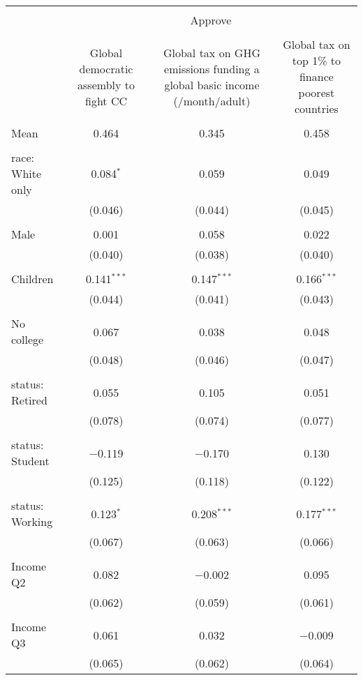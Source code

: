 
\begin{tabular}{@{\extracolsep{5pt}}lccc} 
\\[-1.8ex]\hline 
\hline \\[-1.8ex] 
 & \multicolumn{3}{c}{Approve} \\ 
\cline{2-4} 
\\[-1.8ex] & Global democratic assembly to fight CC & Global tax on GHG emissions funding a global basic income (\textdollar 30/month/adult) & Global tax on top 1\% to finance poorest countries \\ 
\hline \\[-1.8ex] 
 Mean & 0.464 & 0.345 & 0.458  \\ \hline \\[-1.8ex] race: White only & 0.084$^{*}$ & 0.059 & 0.049 \\ 
  & (0.046) & (0.044) & (0.045) \\ 
  & & & \\ 
 Male & 0.001 & 0.058 & 0.022 \\ 
  & (0.040) & (0.038) & (0.040) \\ 
  & & & \\ 
 Children & 0.141$^{***}$ & 0.147$^{***}$ & 0.166$^{***}$ \\ 
  & (0.044) & (0.041) & (0.043) \\ 
  & & & \\ 
 No college & 0.067 & 0.038 & 0.048 \\ 
  & (0.048) & (0.046) & (0.047) \\ 
  & & & \\ 
 status: Retired & 0.055 & 0.105 & 0.051 \\ 
  & (0.078) & (0.074) & (0.077) \\ 
  & & & \\ 
 status: Student & $-$0.119 & $-$0.170 & 0.130 \\ 
  & (0.125) & (0.118) & (0.122) \\ 
  & & & \\ 
 status: Working & 0.123$^{*}$ & 0.208$^{***}$ & 0.177$^{***}$ \\ 
  & (0.067) & (0.063) & (0.066) \\ 
  & & & \\ 
 Income Q2 & 0.082 & $-$0.002 & 0.095 \\ 
  & (0.062) & (0.059) & (0.061) \\ 
  & & & \\ 
 Income Q3 & 0.061 & 0.032 & $-$0.009 \\ 
  & (0.065) & (0.062) & (0.064) \\ 

\end{tabular}
